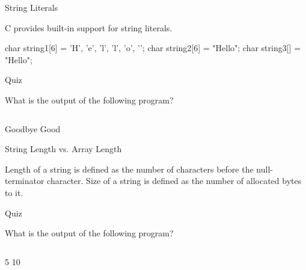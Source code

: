 \documentclass[compress]{beamer}
\begin{document}
\begin{slide}
	\begin{block}{String Literals}

	C provides built-in support for string literals.

	\begin{terminal}
	char string1[6] = {'H', 'e', 'l', 'l', 'o', '\0'};
	char string2[6] = "Hello";
	char string3[] = "Hello";
	\end{terminal}

	\end{block}
\end{slide}

\begin{slide}
	\begin{block}{Quiz}

	What is the output of the following program?

	\inputminted[fontsize=\scriptsize,firstline=10,linenos]{c}{
		\resDirectory/null.c
	}

	\pause

	\begin{terminal}
	Goodbye Good
	\end{terminal}

	\end{block}
\end{slide}

\begin{slide}
	\begin{block}{String Length vs. Array Length}

	Length of a string is defined as the number of characters before the null-terminator character.
	Size of a string is defined as the number of allocated bytes to it.

	\end{block}
\end{slide}

\begin{slide}
	\begin{block}{Quiz}

	What is the output of the following program?

	\inputminted[fontsize=\scriptsize,firstline=10,linenos]{c}{
		\resDirectory/strlen.c
	}

	\pause

	\begin{terminal}
	5 10
	\end{terminal}

	\end{block}
\end{slide}
\end{document}
